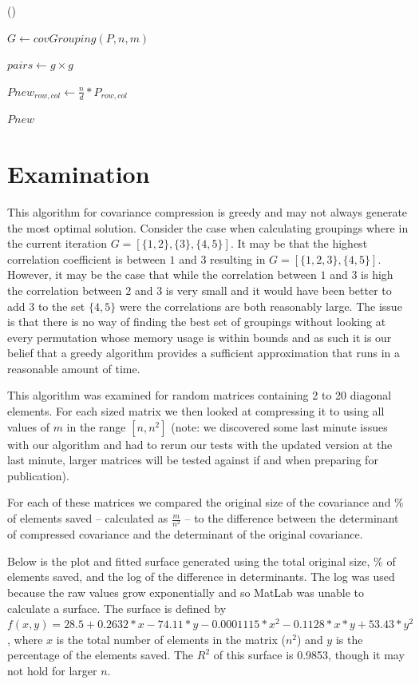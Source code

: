 \documentclass[11pt]{article}
\begin{document}
\begin{algorithm}

 \Begin() {
	$G\leftarrow covGrouping(P,n,m)$
	
	 {
		$pairs\leftarrow g \times g$
		
		 {
			$Pnew_{row,col}\leftarrow \frac{n}{d} * P_{row,col}$
		}
	}
	\Return $Pnew$
}	
\end{algorithm}

\section{Examination}
This algorithm for covariance compression is greedy and may not always generate the most optimal solution. 
Consider the case when calculating groupings where in the current iteration $G = \left[\{1,2\},\{3\},\{4,5\}\right]$. 
It may be that the highest correlation coefficient is between $1$ and $3$ resulting in $G = \left[\{1,2,3\},\{4,5\}\right]$.
However, it may be the case that while the correlation between $1$ and $3$ is high the correlation between $2$ and $3$ is very small and it would have been better to add $3$ to the set $\{4,5\}$ were the correlations are both reasonably large. 
The issue is that there is no way of finding the best set of groupings without looking at every permutation whose memory usage is within bounds and as such it is our belief that a greedy algorithm provides a sufficient approximation that runs in a reasonable amount of time. 
 
This algorithm was examined for random matrices containing 2 to 20 diagonal elements. 
For each sized matrix we then looked at compressing it to using all values of $m$ in the range $\left[n, n^2\right]$
(note: we discovered some last minute issues with our algorithm and had to rerun our tests with the updated version at the last minute, larger matrices will be tested against if and when preparing for publication).

For each of these matrices we compared the original size of the covariance and \% of elements saved -- calculated as $\frac{m}{n^2}$ -- to the difference between the determinant of compressed covariance and the determinant of the original covariance. 

Below is the plot and fitted surface generated using the total original size, \% of elements saved, and the log of the difference in determinants. 
The log was used because the raw values grow exponentially and so MatLab was unable to calculate a surface. The surface is defined by $f(x,y) = 28.5 + 0.2632 * x -74.11 * y - 0.0001115 * x^2 - 0.1128 * x * y + 53.43 * y^2$, where $x$ is the total number of elements in the matrix ($n^2$) and $y$ is the percentage of the elements saved. The $R^2$ of this surface is 0.9853, though it may not hold for larger $n$.
\end{document}
